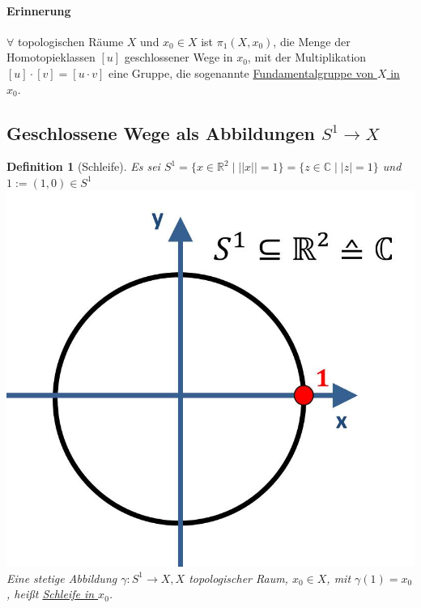\documentclass[a4paper,11pt,notitlepage]{report}
\newtheorem{definition}{Definition}[chapter]
\newcommand{\R}{{\ensuremath{\mathbb{R}}}}
\newcommand{\C}{{\ensuremath{\mathbb{C}}}}
\begin{document}

\paragraph{Erinnerung} $\forall$ topologischen Räume $X$ und $x_0 \in X$ ist $\pi_1(X,x_0)$, die Menge der Homotopieklassen $[u]$ geschlossener Wege in $x_0$, mit der Multiplikation $[u] \cdot [v] = [u \cdot v]$ eine Gruppe, die sogenannte \underline{Fundamentalgruppe von $X$ in $x_0$}.
\newpage
\subsection{Geschlossene Wege als Abbildungen $S^1 \rightarrow X$}
\begin{definition}[Schleife]
	Es sei $S^1 = \{x \in \R^2 \mid ||x|| = 1\} = \{z \in \C \mid |z| = 1\}$
	und $1:= (1,0) \in S^1$ \newline \includegraphics[scale=0.3]{images/S1_mit_1.jpg}\newline
	Eine stetige Abbildung $\gamma \colon S^1 \rightarrow X, X$ topologischer Raum, $x_0 \in X$, mit $\gamma(1)=x_0$, heißt \underline{Schleife in $x_0$}.

\end{definition}
\end{document}
